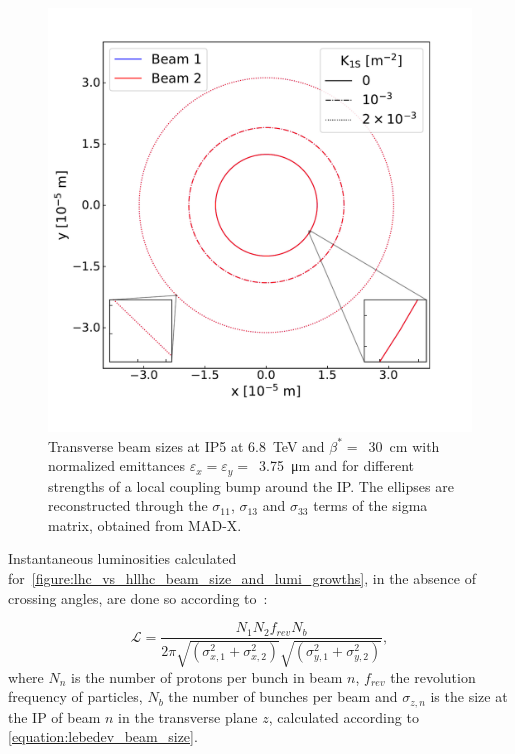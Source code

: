 \begin{figure}[!htb]
    \centering
    \includegraphics*[width=0.75\columnwidth]{Figures/IR_Coupling_Correction/ellipses_various_coupling_bumps.pdf}
    \caption{Transverse beam sizes at IP\num{5} at \qty{6.8}{\tera\electronvolt} and \(\beta^{\ast}=\)~\qty{30}{\centi\meter} with normalized emittances \(\varepsilon_x = \varepsilon_y =\)~\qty{3.75}{\micro\meter} and for different strengths of a local coupling bump around the IP. The ellipses are reconstructed through the \(\sigma_{11}\), \(\sigma_{13}\) and \(\sigma_{33}\) terms of the sigma matrix, obtained from MAD-X.}
    \label{figure:ip_ellipses_from_coupling}
\end{figure}

Instantaneous luminosities calculated for~\cref{figure:lhc_vs_hllhc_beam_size_and_lumi_growths}, in the absence of crossing angles, are done so according to~\cite{CERN:Herr:Concept_Luminosity}:

\begin{equation}
    \mathcal{L} = \frac{N_1 N_2 f_{rev} N_b}{2 \pi \sqrt{\left( \sigma_{x, 1}^2 + \sigma_{x, 2}^2 \right)} \sqrt{\left( \sigma_{y, 1}^2 + \sigma_{y, 2}^2 \right)}} ,
    \label{equation:luminosity_double_beams}
\end{equation}
where \(N_{n}\) is the number of protons per bunch in beam \(n\), \(f_{rev}\) the revolution frequency of particles, \(N_b\) the number of bunches per beam and \(\sigma_{z, n}\) is the size at the IP of beam \(n\) in the transverse plane \(z\), calculated according to \cref{equation:lebedev_beam_size}.

